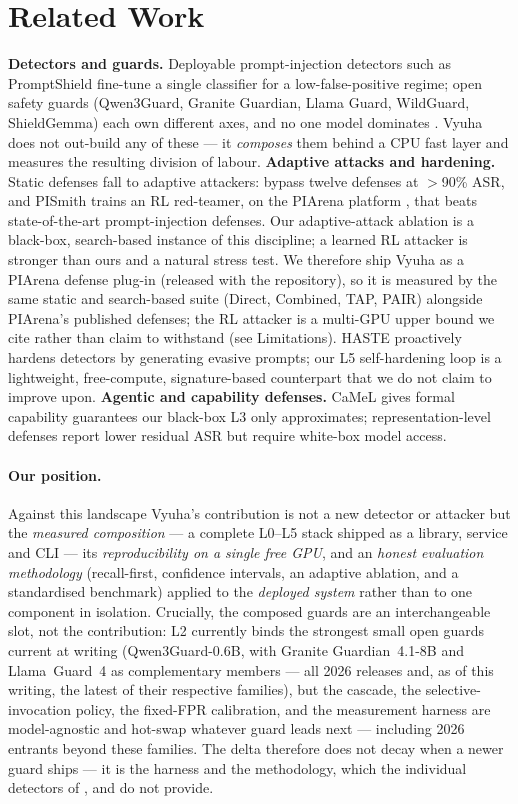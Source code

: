 \documentclass[11pt]{article}
\begin{document}
\section{Related Work}
\textbf{Detectors and guards.} Deployable prompt-injection detectors such as PromptShield
\citep{promptshield} fine-tune a single classifier for a low-false-positive regime; open safety guards
(Qwen3Guard, Granite Guardian, Llama Guard, WildGuard, ShieldGemma) each own different axes, and no one
model dominates \citep{guard-bench}. Vyuha does not out-build any of these --- it \emph{composes} them
behind a CPU fast layer and measures the resulting division of labour.
\textbf{Adaptive attacks and hardening.} Static defenses fall to adaptive attackers:
\citet{attacker-second} bypass twelve defenses at $>$90\% ASR, and PISmith \citep{pismith} trains an
RL red-teamer, on the PIArena platform \citep{piarena}, that beats state-of-the-art prompt-injection
defenses. Our adaptive-attack ablation is a black-box, search-based instance of this discipline; a
learned RL attacker is stronger than ours and a natural stress test. We therefore ship Vyuha as a
PIArena defense plug-in (released with the repository), so it is measured by the same static and search-based suite
(Direct, Combined, TAP, PAIR) alongside PIArena's published defenses; the RL attacker is a multi-GPU
upper bound we cite rather than claim to withstand (see Limitations). HASTE \citep{haste} proactively hardens detectors by generating
evasive prompts; our L5 self-hardening loop is a lightweight, free-compute, signature-based counterpart
that we do not claim to improve upon.
\textbf{Agentic and capability defenses.} CaMeL \citep{camel} gives formal capability guarantees our
black-box L3 only approximates; representation-level defenses report lower residual ASR but require
white-box model access.

\paragraph{Our position.} Against this landscape Vyuha's contribution is not a new detector or attacker
but the \emph{measured composition} --- a complete L0--L5 stack shipped as a library, service and CLI ---
its \emph{reproducibility on a single free GPU}, and an \emph{honest evaluation methodology} (recall-first,
confidence intervals, an adaptive ablation, and a standardised benchmark) applied to the \emph{deployed
system} rather than to one component in isolation. Crucially, the composed guards are an interchangeable
slot, not the contribution: L2 currently binds the strongest small open guards current at writing
(Qwen3Guard-0.6B, with Granite Guardian~4.1-8B and Llama~Guard~4 as complementary members --- all 2026
releases and, as of this writing, the latest of their respective families), but the cascade, the
selective-invocation policy, the fixed-FPR calibration, and the measurement harness are model-agnostic
and hot-swap whatever guard leads next --- including 2026 entrants beyond these families. The delta
therefore does not decay when a newer guard ships --- it is the harness and
the methodology, which the individual detectors of \citet{promptshield}, \citet{pismith} and
\citet{haste} do not provide.
\end{document}
